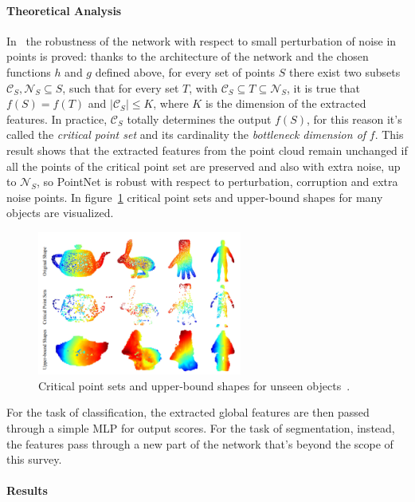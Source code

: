 \paragraph{Theoretical Analysis}

In~\cite{qi2017pointnet} the robustness of the network with respect to small perturbation of noise in points is proved: thanks to the architecture of the network and the chosen functions $h$ and $g$ defined above, for every set of points $S$ there exist two subsets $\mathcal{C}_S, \mathcal{N}_S \subseteq S$, such that for every set $T$, with $\mathcal{C}_S \subseteq T \subseteq \mathcal{N}_S$, it is true that $f(S) = f(T)$ and $|\mathcal{C}_S| \le K$, where $K$ is the dimension of the extracted features. In practice, $\mathcal{C}_S$ totally determines the output $f(S)$, for this reason it's called the \textit{critical point set} and its cardinality the \textit{bottleneck dimension of} $f$. This result shows that the extracted features from the point cloud remain unchanged if all the points of the critical point set are preserved and also with extra noise, up to $\mathcal{N}_S$, so PointNet is robust with respect to perturbation, corruption and extra noise points. In figure~\ref{fig:critical_point_sets} critical point sets and upper-bound shapes for many objects are visualized.

\begin{figure}[ht]
    \centering
    \includegraphics[width=0.6\textwidth]{images/critical_point_sets.png}
    \caption{Critical point sets and upper-bound shapes for unseen objects~\cite{qi2017pointnet}.}
    \label{fig:critical_point_sets}
\end{figure}

For the task of classification, the extracted global features are then passed through a simple MLP for output scores. For the task of segmentation, instead, the features pass through a new part of the network that's beyond the scope of this survey.

\paragraph{Results}

